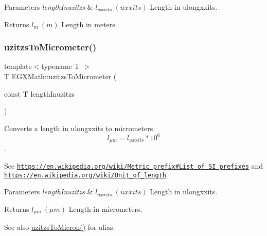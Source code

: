 \begin{DoxyParams}{Parameters}
{\em length\+Inuzitzs} & $ l_{uxxits}\ (uxxits)$ Length in ulongxxits. \\
\hline
\end{DoxyParams}
\begin{DoxyReturn}{Returns}
$ l_{m}\ (m)$ Length in meters. 
\end{DoxyReturn}
\mbox{\label{group___e_g_x_math-_conversions-_length_conversions-_non-_s_i-uzitzs-_s_i_ga0bd484a80b8b66cd5272bbbc1fe6b642}} 
\subsubsection{\texorpdfstring{uzitzs\+To\+Micrometer()}{uzitzsToMicrometer()}}
{\footnotesize\ttfamily template$<$typename T $>$ \\
T E\+G\+X\+Math\+::uzitzs\+To\+Micrometer (\begin{DoxyParamCaption}\item[{const T}]{length\+Inuzitzs }\end{DoxyParamCaption})}



Converts a length in ulongxxits to micrometers. \[ l_{\mu m}=l_{uxxits} * 10^{6} \]. 

See \href{https://en.wikipedia.org/wiki/Metric_prefix#List_of_SI_prefixes}{\tt https\+://en.\+wikipedia.\+org/wiki/\+Metric\+\_\+prefix\#\+List\+\_\+of\+\_\+\+S\+I\+\_\+prefixes} and \href{https://en.wikipedia.org/wiki/Unit_of_length}{\tt https\+://en.\+wikipedia.\+org/wiki/\+Unit\+\_\+of\+\_\+length} 
\begin{DoxyParams}{Parameters}
{\em length\+Inuzitzs} & $ l_{uxxits}\ (uxxits)$ Length in ulongxxits. \\
\hline
\end{DoxyParams}
\begin{DoxyReturn}{Returns}
$ l_{\mu m}\ (\mu m)$ Length in micrometers. 
\end{DoxyReturn}
\begin{DoxySeeAlso}{See also}
\mbox{\hyperlink{group___e_g_x_math-_conversions-_length_conversions-_non-_s_i-uzitzs-_non-_s_i_ga695a8fd8870537930d6378e99ad2aa9f}{uzitzs\+To\+Micron()}} for alias. 
\end{DoxySeeAlso}
\mbox{\label{group___e_g_x_math-_conversions-_length_conversions-_non-_s_i-uzitzs-_s_i_gaf507dd646327861da523586b417d132e}} 
